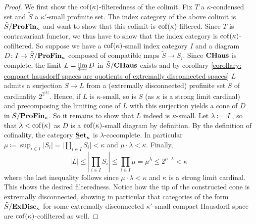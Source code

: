 \begin{proof}
	We first show the ${\operatorname{cof}(\kappa)}$-filteredness of the colimit. Fix $T$ a $\kappa$-condensed set and $\tilde S$ a $\kappa'$-small profinite set. The index category of the above colimit is $\tilde S/{\mathbf{ProFin}}_{\kappa}$ and want to show that this colimit is ${\operatorname{cof}(\kappa)}$-filtered. Since $T$ is contravariant functor, we thus have to show that the index category is ${\operatorname{cof}(\kappa)}$-cofiltered. So suppose we have a ${\operatorname{cof}(\kappa)}$-small index category $I$ and a diagram $D\colon I\to \tilde S/{\mathbf{ProFin}}_{\kappa}$ composed of compatible maps $\tilde S\to S_i$. Since ${{\mathbf{CHaus}}}$ is complete, the limit $L = \varprojlim D$ in $\tilde S/{{\mathbf{CHaus}}}$ exists and by corollary \ref{corollary: compact hausdorff spaces are quotients of extremally disconnected spaces} $L$ admits a surjection $S\to L$ from a (extremally disconnected) profinite set $S$ of cardinality $2^{2^{\vert L\vert}}$. Hence, if $L$ is $\kappa$-small, so is $S$ (as $\kappa$ is a strong limit cardinal) and precomposing the limiting cone of $L$ with this surjection yields a cone of $D$ in $\tilde S/{\mathbf{ProFin}}_{\kappa}$. So it remains to show that $L$ indeed is $\kappa$-small. Let $\lambda \coloneqq \vert I\vert$, so that $\lambda < {\operatorname{cof}(\kappa)}$ as $D$ is a ${\operatorname{cof}(\kappa)}$-small diagram by definition. By the definition of cofinality, the category ${{{\mathbf{\underline{S}et}}}_{\kappa}}$ is $\lambda$-cocomplete. In particular $\mu\coloneqq \sup_{i\in I} \vert S_i\vert = \vert \coprod_{i\in I} S_i\vert < \kappa$ and $\mu\cdot \lambda < \kappa$. Finally,
	$$\vert L\vert \le \left\vert \prod_{i\in I} S_i\right\vert \le \prod_{i\in I} \mu = \mu^\lambda \le 2^{\mu \cdot \lambda} < \kappa$$
	where the last inequality follows since $\mu\cdot \lambda <\kappa$ and $\kappa$ is a strong limit cardinal. This shows the desired filteredness. Notice how the tip of the constructed cone is extremally disconnected, showing in particular that categories of the form $\tilde S/{\mathbf{ExDisc}}_{\kappa}$ for some extremally disconnected $\kappa'$-small compact Hausdorff space are ${\operatorname{cof}(\kappa)}$-cofiltered as well.
	

\end{proof}
